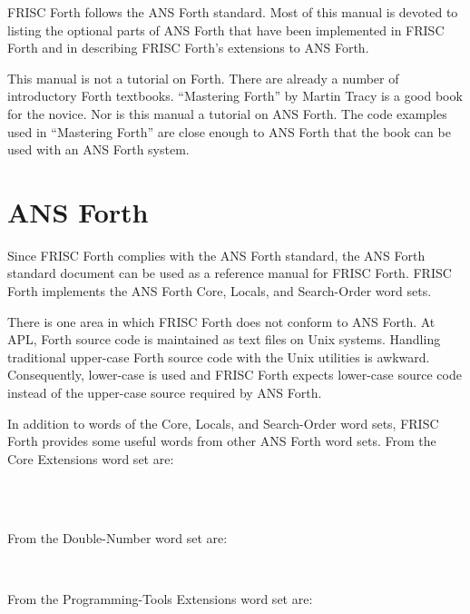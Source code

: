 FRISC Forth follows the ANS Forth standard.
Most of this manual is devoted to listing the optional parts of ANS
Forth that have been implemented in FRISC Forth and in
describing FRISC Forth's extensions to ANS Forth.

This manual is not a tutorial on Forth.  There are already a number of
introductory Forth textbooks.  ``Mastering Forth'' by Martin Tracy is a
good book for the novice.  Nor is this manual a tutorial on ANS Forth.
The code examples used in ``Mastering Forth'' are close enough to
ANS Forth that the book can be used with an ANS Forth system.

\section{ANS Forth}
Since FRISC Forth complies with the ANS Forth standard, the ANS
Forth standard document can be used as a reference manual for FRISC
Forth.  FRISC Forth implements the ANS Forth Core, Locals,
and Search-Order word sets.

There is one area in which FRISC Forth does not conform to ANS Forth.
At APL, Forth source code is maintained as text files on Unix
systems.  Handling traditional upper-case Forth source code with
the Unix utilities is awkward.  Consequently, lower-case is used
and FRISC Forth expects
lower-case source code instead of the upper-case source required
by ANS Forth.

In addition to words of the Core, Locals, and Search-Order word sets,
FRISC Forth provides some useful words from other ANS Forth
word sets.  From the Core Extensions word set are:
\begin{center}
\ \ \ \ \ \ \ \ \ 
\ \ \ \fw{$<>$}\ \ \ \ \ \  \\
\fw{convert}\ \ \
\fw{false}\ \ \ \fw{hex}\ \ \ \fw{j}\ \ \ \ \ \ \ \ \ 
\ \ \ \ \ \ \ \ \ \ \ \
\ \ \ \fw{\\}
\end{center}

From the Double-Number word set are:
\begin{center}
\ \ \ \ \ \ \ \ \ \ \ \ \ \ \ 
\ \ \ 
\end{center}

From the Programming-Tools Extensions word set are:
\begin{center}
\fw{?}\ \ \ \fw{dump}\ \ \ 
\end{center}

